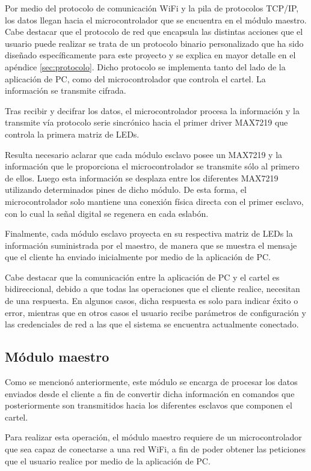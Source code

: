 Por medio del protocolo de comunicación WiFi y la pila de protocolos TCP/IP, los datos llegan hacia el microcontrolador que se encuentra en el módulo maestro. Cabe destacar que el protocolo de red que encapsula las distintas acciones que el usuario puede realizar se trata de un protocolo binario personalizado que ha sido diseñado específicamente para este proyecto y se explica en mayor detalle en el apéndice \ref{sec:protocolo}.
Dicho protocolo se implementa tanto del lado de la aplicación de PC, como del microcontrolador que controla el cartel. La información se transmite cifrada.

Tras recibir y decifrar los datos, el microcontrolador procesa la información y la transmite vía protocolo serie sincrónico hacia el primer driver MAX7219 que controla la primera matriz de LEDs.

Resulta necesario aclarar que cada módulo esclavo posee un MAX7219 y la información que le proporciona el microcontrolador se transmite sólo al primero de ellos. Luego esta información se desplaza entre los diferentes MAX7219 utilizando determinados pines de dicho módulo.
De esta forma, el microcontrolador solo mantiene una conexión física directa con el primer esclavo, con lo cual la señal digital se regenera en cada eslabón.

Finalmente, cada módulo esclavo proyecta en su respectiva matriz de LEDs la información suministrada por el maestro, de manera que se muestra el mensaje que el cliente ha enviado inicialmente por medio de la aplicación de PC.

Cabe destacar que la comunicación entre la aplicación de PC y el cartel es bidireccional, debido a que todas las operaciones que el cliente realice, necesitan de una respuesta.
En algunos casos, dicha respuesta es solo para indicar éxito o error, mientras que en otros casos el usuario recibe parámetros de configuración y las credenciales de red a las que el sistema se encuentra actualmente conectado.

\subsection{Módulo maestro}
Como se mencionó anteriormente, este módulo se encarga de procesar los datos enviados desde el cliente a fin de convertir dicha información en comandos que posteriormente son transmitidos hacia los diferentes esclavos que componen el cartel.

Para realizar esta operación, el módulo maestro requiere de un microcontrolador que sea capaz de conectarse a una red WiFi, a fin de poder obtener las peticiones que el usuario realice por medio de la aplicación de PC.

